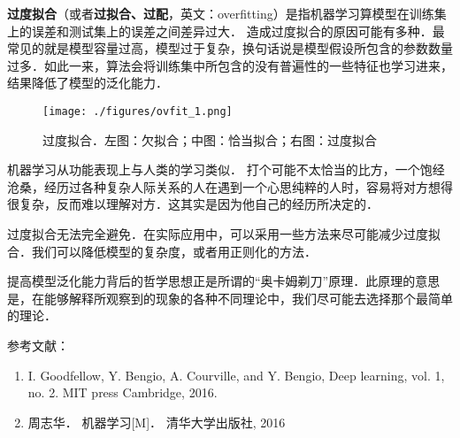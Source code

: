 
\textbf{过度拟合}（或者\textbf{过拟合、过配}，英文：overfitting）是指机器学习算模型在训练集上的误差和测试集上的误差之间差异过大．
造成过度拟合的原因可能有多种．最常见的就是模型容量过高，模型过于复杂，换句话说是模型假设所包含的参数数量过多．如此一来，算法会将训练集中所包含的没有普遍性的一些特征也学习进来，结果降低了模型的泛化能力．

\begin{figure}[ht]
\centering
\texttt{[image: ./figures/ovfit\_1.png]}
\caption{过度拟合．左图：欠拟合；中图：恰当拟合；右图：过度拟合} \label{ovfit_fig1}
\end{figure}

机器学习从功能表现上与人类的学习类似．
打个可能不太恰当的比方，一个饱经沧桑，经历过各种复杂人际关系的人在遇到一个心思纯粹的人时，容易将对方想得很复杂，反而难以理解对方．这其实是因为他自己的经历所决定的．

过度拟合无法完全避免．在实际应用中，可以采用一些方法来尽可能减少过度拟合．我们可以降低模型的复杂度，或者用正则化的方法．

提高模型泛化能力背后的哲学思想正是所谓的“奥卡姆剃刀”原理．此原理的意思是，在能够解释所观察到的现象的各种不同理论中，我们尽可能去选择那个最简单的理论．



参考文献：
\begin{enumerate}
\item I. Goodfellow, Y. Bengio, A. Courville, and Y. Bengio, Deep learning, vol. 1, no. 2. MIT press Cambridge, 2016.
\item 周志华． 机器学习[M]． 清华大学出版社, 2016
\end{enumerate}